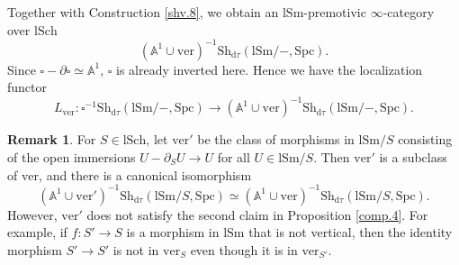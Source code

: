 \documentclass[10pt]{amsart}
\theoremstyle{definition}
\newtheorem{rmk}[thm]{Remark}
\theoremstyle{remark}
\numberwithin{equation}{subsection}
\newcommand{\A}{\mathbb{A}}
\newcommand{\boxx}{\square}
\newcommand{\lSch}{\mathrm{lSch}}
\newcommand{\lSm}{\mathrm{lSm}}
\newcommand{\infShv}{\mathrm{Sh}}
\newcommand{\Spc}{\mathrm{Spc}}
\newcommand{\ver}{\mathrm{ver}}
\newcommand{\dtau}{\mathrm{d}\tau}
\begin{document}
Together with Construction \ref{shv.8}, we obtain an $\lSm$-premotivic $\infty$-category over $\lSch$
\[
(\A^1\cup \ver)^{-1}\infShv_{\dtau}(\lSm/-,\Spc).
\]
Since $\boxx-\partial \boxx\simeq \A^1$, $\boxx$ is already inverted here.
Hence we have the localization functor
\begin{equation}
L_{\ver}
\colon
\square^{-1}\infShv_{\dtau}(\lSm/-,\Spc) \to (\A^1\cup \ver)^{-1}\infShv_{\dtau}(\lSm/-,\Spc).
\end{equation}

\begin{rmk}
For $S\in \lSch$,
let $\ver'$ be the class of morphisms in $\lSm/S$ consisting of the open immersions $U-\partial_S U\to U$ for all $U\in \lSm/S$.
Then $\ver'$ is a subclass of $\ver$, and there is a canonical isomorphism
\[
(\A^1\cup \ver')^{-1}\infShv_{\dtau}(\lSm/S,\Spc)
\simeq
(\A^1\cup \ver)^{-1}\infShv_{\dtau}(\lSm/S,\Spc).
\]
However, $\ver'$ does not satisfy the second claim in Proposition \ref{comp.4}.
For example, if $f\colon S'\to S$ is a morphism in $\lSm$ that is not vertical, then the identity morphism $S'\to S'$ is not in $\ver_{S}$ even though it is in $\ver_{S'}$.
\end{rmk}
\end{document}
